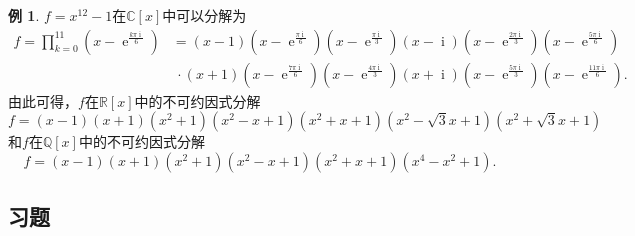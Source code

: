 \documentclass[a4paper,fontset=windows]{ctexbook}
\theoremstyle{definition}
\newtheorem{example}{例}[chapter]
\DeclareMathOperator{\E}{e}
\DeclareMathOperator{\I}{i}
\begin{document}
\begin{example}
$f=x^{12}-1$在$\mathbb{C}[x]$中可以分解为
\begin{align*}
f=\prod_{k=0}^{11}(x-\E^{\frac{k\pi\I}{6}})&=(x-1)(x-\E^{\frac{\pi\I}{6}})(x-\E^{\frac{\pi\I}{3}})(x-\I)(x-\E^{\frac{2\pi\I}{3}})(x-\E^{\frac{5\pi\I}{6}}) \\
&~\cdot(x+1)(x-\E^{\frac{7\pi\I}{6}})(x-\E^{\frac{4\pi\I}{3}})(x+\I)(x-\E^{\frac{5\pi\I}{3}})(x-\E^{\frac{11\pi\I}{6}}).
\end{align*}
由此可得，$f$在$\mathbb{R}[x]$中的不可约因式分解
$$f=(x-1)(x+1)(x^2+1)(x^2-x+1)(x^2+x+1)(x^2-\sqrt{3}x+1)(x^2+\sqrt{3}x+1)$$
和$f$在$\mathbb{Q}[x]$中的不可约因式分解
$$f=(x-1)(x+1)(x^2+1)(x^2-x+1)(x^2+x+1)(x^4-x^2+1).$$
\end{example}

\subsection*{习题}
\end{document}
